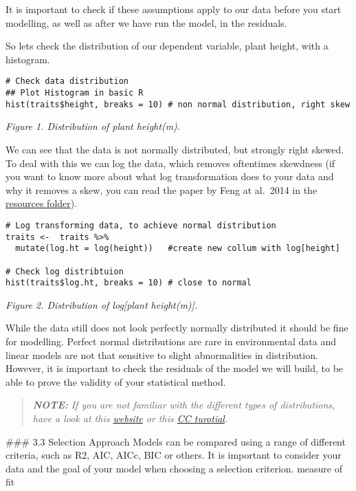 \documentclass[
]{article}
\begin{document}
It is important to check if these assumptions apply to our data before
you start modelling, as well as after we have run the model, in the
residuals.

So lets check the distribution of our dependent variable, plant height,
with a histogram.

\begin{verbatim}
# Check data distribution
## Plot Histogram in basic R 
hist(traits$height, breaks = 10) # non normal distribution, right skew
\end{verbatim}

\emph{Figure 1. Distribution of plant height(m).}

We can see that the data is not normally distributed, but strongly right
skewed. To deal with this we can log the data, which removes oftentimes
skewdness (if you want to know more about what log transformation does
to your data and why it removes a skew, you can read the paper by Feng
at al.~2014 in the \href{}{resources folder}).

\begin{verbatim}
# Log transforming data, to achieve normal distribution
traits <-  traits %>%
  mutate(log.ht = log(height))   #create new collum with log[height]

# Check log distribtuion 
hist(traits$log.ht, breaks = 10) # close to normal
\end{verbatim}

\emph{Figure 2. Distribution of log{[}plant height(m){]}.}

While the data still does not look perfectly normally distributed it
should be fine for modelling. Perfect normal distributions are rare in
environmental data and linear models are not that sensitive to slight
abnormalities in distribution. However, it is important to check the
residuals of the model we will build, to be able to prove the validity
of your statistical method.

\begin{quote}
\textbf{\emph{NOTE:}} \emph{If you are not familiar with the different
types of distributions, have a look at this
\href{https://www.itl.nist.gov/div898/handbook/eda/section3/eda366.htm}{website}
or this \href{https://ourcodingclub.github.io/tutorials/modelling/}{CC
turotial}.}
\end{quote}

\#\#\# 3.3 Selection Approach Models can be compared using a range of
different criteria, such as R2, AIC, AICc, BIC or others. It is
important to consider your data and the goal of your model when choosing
a selection criterion. measure of fit
\end{document}
